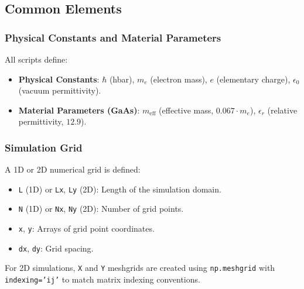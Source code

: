 \documentclass{article}
\begin{document}
\subsection{Common Elements}
\subsubsection{Physical Constants and Material Parameters}
All scripts define:
\begin{itemize}
    \item \textbf{Physical Constants}: $\hbar$ (hbar), $m_e$ (electron mass), $e$ (elementary charge), $\epsilon_0$ (vacuum permittivity).
    \item \textbf{Material Parameters (GaAs)}: $m_{\text{eff}}$ (effective mass, $0.067 \cdot m_e$), $\epsilon_r$ (relative permittivity, $12.9$).
\end{itemize}

\subsubsection{Simulation Grid}
A 1D or 2D numerical grid is defined:
\begin{itemize}
    \item \texttt{L} (1D) or \texttt{Lx}, \texttt{Ly} (2D): Length of the simulation domain.
    \item \texttt{N} (1D) or \texttt{Nx}, \texttt{Ny} (2D): Number of grid points.
    \item \texttt{x}, \texttt{y}: Arrays of grid point coordinates.
    \item \texttt{dx}, \texttt{dy}: Grid spacing.
\end{itemize}
For 2D simulations, \texttt{X} and \texttt{Y} meshgrids are created using \texttt{np.meshgrid} with \texttt{indexing='ij'} to match matrix indexing conventions.
\end{document}
